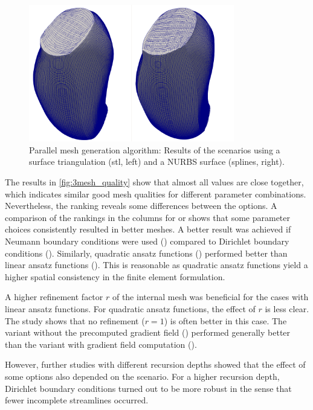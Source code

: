 \begin{figure}%
  \centering%
  \includegraphics[width=0.8\textwidth]{images/parallel_fiber_estimation/stl_splines_results.png}%
  \caption{Parallel mesh generation algorithm: Results of the scenarios using a surface triangulation (stl, left) and a NURBS surface (splines, right).}%
  \label{fig:stl_splines_results}%
\end{figure}%

The results in \cref{fig:3mesh_quality} show that almost all values are close together, which indicates similar good mesh qualities for different parameter combinations.
Nevertheless, the ranking reveals some differences between the options. 
A comparison of the rankings in the columns for  or  shows that some parameter choices consistently resulted in better meshes. 
A better result was achieved if Neumann boundary conditions were used () compared to Dirichlet boundary conditions (). 
Similarly, quadratic ansatz functions () performed better than linear ansatz functions (\say{$\ell$}). This is reasonable as quadratic ansatz functions yield a higher spatial consistency in the finite element formulation. 

A higher refinement factor $r$ of the internal mesh was beneficial for the cases with linear ansatz functions. For quadratic ansatz functions, the effect of $r$ is less clear. The study shows that no refinement ($r=1$) is often better in this case.
The variant without the precomputed gradient field () performed generally better than the variant with gradient field computation ().

However, further studies with different recursion depths showed that the effect of some options also depended on the scenario. For a higher recursion depth, Dirichlet boundary conditions turned out to be more robust in the sense that fewer incomplete streamlines occurred.

